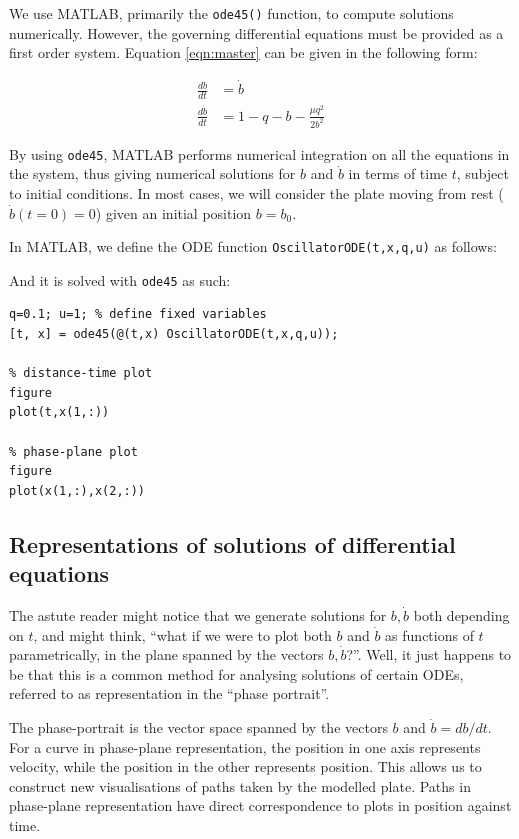 \documentclass{article}
\begin{document}
We use MATLAB, primarily the \texttt{ode45()} function, to compute solutions numerically.
However, the governing differential equations must be provided as a first order system.
Equation \ref{eqn:master} can be given in the following form:

\begin{align}
    \frac{db}{dt}       & = \dot{b}                          \\
    \frac{d\dot{b}}{dt} & = 1 - q - b - \frac{\mu q^2}{2b^2}
    \label{eqn:first_order_system}
\end{align}

By using \texttt{ode45}, MATLAB performs numerical integration on all the equations in the system,
thus giving numerical solutions for $b$ and $\dot{b}$ in terms of time $t$, subject to initial conditions.
In most cases, we will consider the plate moving from rest ($\dot{b}(t=0) = 0$) given an initial position $b=b_0$.

In MATLAB, we define the ODE function \texttt{OscillatorODE(t,x,q,u)} as follows:


And it is solved with \texttt{ode45} as such:

\begin{verbatim}
q=0.1; u=1; % define fixed variables
[t, x] = ode45(@(t,x) OscillatorODE(t,x,q,u));

% distance-time plot
figure
plot(t,x(1,:))

% phase-plane plot
figure
plot(x(1,:),x(2,:))
\end{verbatim}

\subsection{Representations of solutions of differential equations}


The astute reader might notice that we generate solutions for $b,\dot{b}$ both depending on $t$,
and might think, ``what if we were to plot both $b$ and $\dot{b}$ as functions of $t$ parametrically,
in the plane spanned by the vectors $b,\dot{b}$?''.
Well, it just happens to be that this is a common method for analysing solutions of certain ODEs,
referred to as representation in the ``phase portrait''. %

The phase-portrait is the vector space spanned by the vectors $b$ and $\dot{b}=db/dt$.
For a curve in phase-plane representation, the position in one axis represents velocity, while the position in the other represents position.
This allows us to construct new visualisations of paths taken by the modelled plate.
Paths in phase-plane representation have direct correspondence to plots in position against time.
\end{document}
